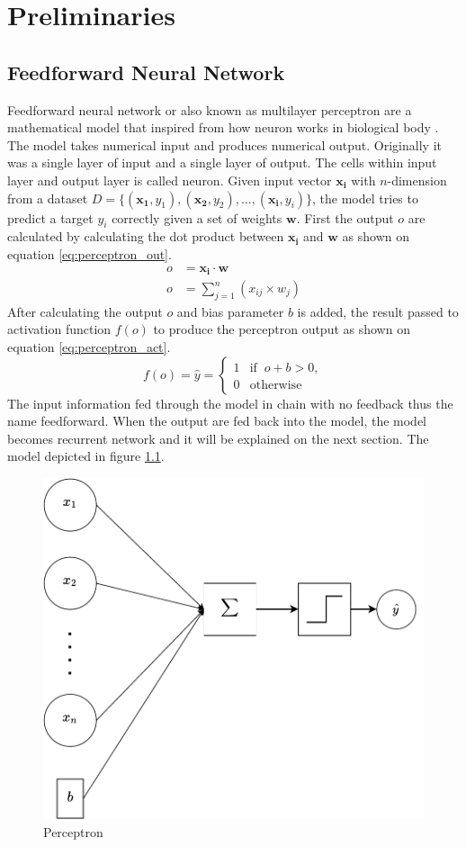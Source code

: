 \chapter{Preliminaries}
\label{chap:preliminaries}

\section{Feedforward Neural Network}
    Feedforward neural network or also known as multilayer perceptron
    are a mathematical model that inspired from how neuron works in
    biological body \citep{Goodfellow-et-al-2016}. The model takes
    numerical input and produces numerical output. Originally it was a
    single layer of input and a single layer of output. The cells
    within input layer and output layer is called neuron. Given input
    vector $\mathbf{x_i}$ with $n$-dimension from a dataset $D =
    \{(\mathbf{x_1}, y_1), (\mathbf{x_2}, y_2), \dots, (\mathbf{x_i},
    y_i)\}$, the model tries to predict a target $y_i$ correctly given
    a set of weights $\mathbf{w}$. First the output $o$ are calculated
    by calculating the dot product between $\mathbf{x_i}$ and
    $\mathbf{w}$ as shown on equation \ref{eq:perceptron_out}. 
    \begin{align}
        \label{eq:perceptron_out}
        o &= \mathbf{x_i} \cdot \mathbf{w} \\
        o &= \sum_{j=1}^n (x_{ij} \times w_j)
    \end{align}
    After calculating the output $o$ and bias parameter $b$ is added,
    the result passed to activation function $f(o)$ to produce the
    perceptron output as shown on equation \ref{eq:perceptron_act}.
    \begin{equation}
        \label{eq:perceptron_act}
        f(o) = \hat{y} =
        \begin{cases}
            1 & \text{if }\ o + b > 0,\\
            0 & \text{otherwise}
        \end{cases}
    \end{equation}
    The input information fed through the model in chain with no
    feedback thus the name feedforward. When the output are fed back
    into the model, the model becomes recurrent network and it will be
    explained on the next section. The model depicted in figure
    \ref{fig:perceptron}.

    \begin{figure}
        \centering
        \includegraphics[width=.5\linewidth]{images/perceptron.pdf}
        \caption{Perceptron}
        \label{fig:perceptron}
    \end{figure}
    
